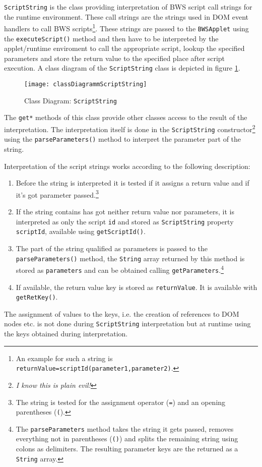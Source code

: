 \texttt{ScriptString} is the class providing interpretation of BWS script call strings for the runtime environment. These call strings are the strings used in DOM event handlers to call BWS scripts\footnote{An example for such a string is \texttt{returnValue=scriptId(parameter1,parameter2)}.}. These strings are passed to the \texttt{BWSApplet} using the \texttt{executeScript()} method and then have to be interpreted by the applet/runtime enviroment to call the appropriate script, lookup the specified parameters and store the return value to the specified place after script execution. A class diagram of the \texttt{ScriptString} class is depicted in figure \ref{fig:classDiagramScriptString}.

\begin{figure}[htbp]
	\centering
		\texttt{[image: classDiagrammScriptString]}
		\caption{Class Diagram: \texttt{ScriptString}}
	\label{fig:classDiagramScriptString}
\end{figure}

The \texttt{get*} methods of this class provide other classes access to the result of the interpretation. The interpretation itself is done in the \texttt{ScriptString} constructor\footnote{\emph{I know this is plain evil!}} using the \texttt{parseParameters()} method to interpret the parameter part of the string.

Interpretation of the script strings works according to the following description:
\begin{enumerate}
  \item Before the string is interpreted it is tested if it assigns a return value and if it's got parameter passed.\footnote{The string is tested for the assignment operator (\texttt{=}) and an opening parentheses (\texttt{(}).}
	\item If the string contains has got neither return value nor parameters, it is interpreted as only the script \texttt{id} and stored as \texttt{ScriptString} property \texttt{scriptId}, available using \texttt{getScriptId()}.
	\item The part of the string qualified as parameters is passed to the \texttt{parseParameters()} method, the \texttt{String} array returned by this method is stored as \texttt{parameters} and can be obtained calling \texttt{getParameters}.\footnote{The \texttt{parseParameters} method takes the string it gets passed, removes everything not in parentheses (\texttt{()}) and splits the remaining string using colons as delimiters. The resulting parameter keys are the returned as a \texttt{String} array.}
	\item If available, the return value key is stored as \texttt{returnValue}. It is available with \texttt{getRetKey()}.
	
\end{enumerate}

The assignment of values to the keys, i.e. the creation of references to DOM nodes etc. is not done during \texttt{ScriptString} interpretation but at runtime using the keys obtained during interpretation.